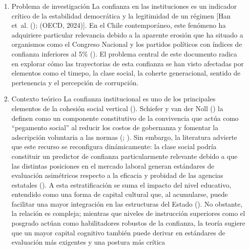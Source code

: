 \documentclass[
  spanish,
  a4paper,
  oneside]{scrbook}
\begin{document}
\begin{enumerate}
\def\labelenumi{\arabic{enumi}.}
\item
  Problema de investigación La confianza en las instituciones es un
  indicador crítico de la estabilidad democrática y la legitimidad de un
  régimen {[}Han et~al. (); (OECD,
  2024){]}. En el Chile contemporáneo, este fenómeno ha adquiriere
  particular relevancia debido a la aparente erosión que ha situado a
  organismos como el Congreso Nacional y los partidos políticos con
  índices de confianza inferiores al 5\%
  (). El problema central de este
  documento radica en explorar cómo las trayectorias de esta confianza
  se han visto afectadas por elementos como el timepo, la clase social,
  la coherte generacional, sentido de pertenencia y el percepción de
  corrupción.
\item
  Contexto teórico La confianza institucional es uno de los principales
  elementos de la cohesión social vertical
  (). Schiefer y
  van der Noll () la definen como un
  componente constitutivo de la convivencia que actúa como ``pegamento
  social'' al reducir los costos de gobernanza y fomentar la adscripción
  voluntaria a las normas (;
  ). Sin embargo, la literatura
  advierte que este recurso se reconfigura dinámicamente: la clase
  social podría constituir un predictor de confianza particularmente
  relevante debido a que las distintas posiciones en el mercado laboral
  generan estándares de evaluación asimétricos respecto a la eficacia y
  probidad de las agencias estatales
  (). A
  esta estratificación se suma el impacto del nivel educativo, entendido
  como una forma de capital cultural que, al acumularse, puede facilitar
  una mayor integración en las estructuras del Estado
  (). No obstante, la
  relación es compleja; mientras que niveles de instrucción superiores
  como el posgrado actúan como habilitadores robustos de la confianza,
  la teoría sugiere que un mayor capital cognitivo también puede derivar
  en estándares de evaluación más exigentes y una postura más crítica

\end{enumerate}
\end{document}

